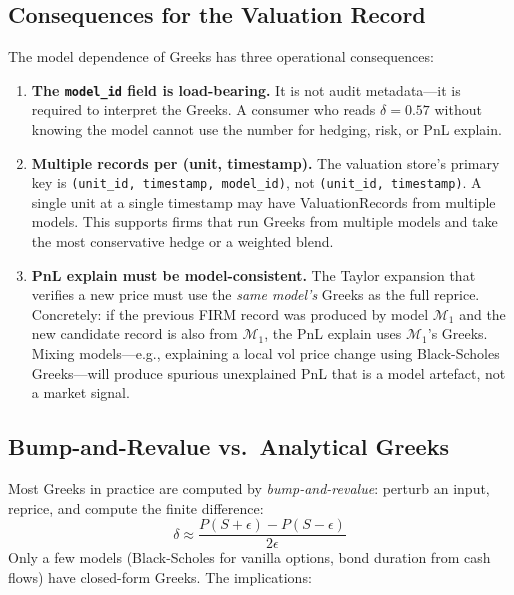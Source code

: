\documentclass[11pt,a4paper]{article}
\begin{document}
\subsection{Consequences for the Valuation Record}

The model dependence of Greeks has three operational consequences:

\begin{enumerate}
\item \textbf{The \texttt{model\_id} field is load-bearing.}  It is not audit metadata---it is required to interpret the Greeks.  A consumer who reads $\delta = 0.57$ without knowing the model cannot use the number for hedging, risk, or PnL explain.

\item \textbf{Multiple records per (unit, timestamp).}  The valuation store's primary key is \texttt{(unit\_id, timestamp, model\_id)}, not \texttt{(unit\_id, timestamp)}.  A single unit at a single timestamp may have ValuationRecords from multiple models.  This supports firms that run Greeks from multiple models and take the most conservative hedge or a weighted blend.

\item \textbf{PnL explain must be model-consistent.}  The Taylor expansion that verifies a new price must use the \emph{same model's} Greeks as the full reprice.  Concretely: if the previous FIRM record was produced by model $\mathcal{M}_1$ and the new candidate record is also from $\mathcal{M}_1$, the PnL explain uses $\mathcal{M}_1$'s Greeks.  Mixing models---e.g., explaining a local vol price change using Black-Scholes Greeks---will produce spurious unexplained PnL that is a model artefact, not a market signal.
\end{enumerate}

\subsection{Bump-and-Revalue vs.\ Analytical Greeks}

Most Greeks in practice are computed by \emph{bump-and-revalue}: perturb an input, reprice, and compute the finite difference:
\[
\delta \approx \frac{P(S + \epsilon) - P(S - \epsilon)}{2\epsilon}
\]
Only a few models (Black-Scholes for vanilla options, bond duration from cash flows) have closed-form Greeks.  The implications:
\end{document}
